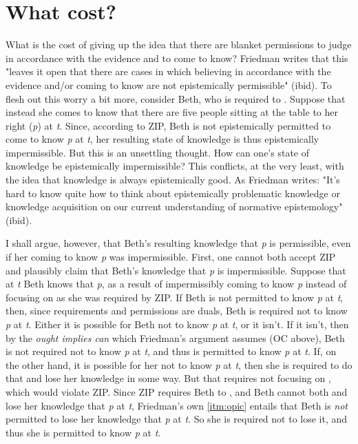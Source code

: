 \documentclass[12pt]{article}
\begin{document}
\section{What cost?}

What is the cost of giving up the idea that there are blanket permissions to judge in accordance with the evidence and to come to know? Friedman writes that this "leaves it open that there are cases in which believing in accordance with the evidence and/or coming to know are not epistemically permissible" (ibid). To flesh out this worry a bit more, consider Beth, who is required to \foc{}. Suppose that instead she comes to know that there are five people sitting at the table to her right (\textit{p}) at \textit{t}. Since, according to ZIP, Beth is not epistemically permitted to come to know \textit{p} at \textit{t}, her resulting state of knowledge is thus epistemically impermissible. But this is an unsettling thought. How can one's state of knowledge be epistemically impermissible? This conflicts, at the very least, with the idea that knowledge is always epistemically good. As Friedman writes: "It’s hard to know quite how to think about epistemically problematic knowledge or knowledge acquisition on our current understanding of normative epistemology" (ibid).

I shall argue, however, that Beth's resulting knowledge that \textit{p} is permissible, even if her coming to know \textit{p} was impermissible. First, one cannot both accept ZIP and plausibly claim that Beth's knowledge that \textit{p} is impermissible. Suppose that at \textit{t} Beth knows that \textit{p}, as a result of impermissibly coming to know \textit{p} instead of focusing on  as she was required by ZIP. If Beth is not permitted to know \textit{p} at \textit{t}, then, since requirements and permissions are duals, Beth is required not to know \textit{p} at \textit{t}. Either it is possible for Beth not to know \textit{p} at \textit{t}, or it isn't. If it isn't, then by the \textit{ought implies can} which Friedman's argument assumes (OC above), Beth is not required not to know \textit{p} at \textit{t}, and thus is permitted to know \textit{p} at \textit{t}. If, on the other hand, it is possible for her not to know \textit{p} at \textit{t}, then she is required to do that and lose her knowledge in some way. But that requires not focusing on , which would violate ZIP. Since ZIP requires Beth to \foc{}, and Beth cannot both \foc{} and lose her knowledge that \textit{p} at \textit{t}, Friedman's own \ref*{itm:opic} entails that Beth is \textit{not} permitted to lose her knowledge that \textit{p} at \textit{t}. So she is required not to lose it, and thus she is permitted to know \textit{p} at \textit{t}.
\end{document}
